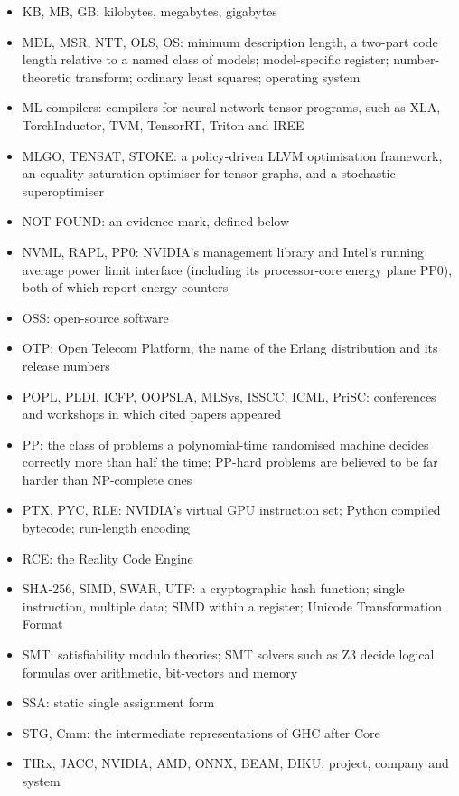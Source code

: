 \documentclass[10pt,letterpaper]{article}
\begin{document}
\begin{itemize}
  LTO, LZ77: link-time optimisation; Lempel--Ziv 1977 sliding-window
  compression
\item
  KB, MB, GB: kilobytes, megabytes, gigabytes
\item
  MDL, MSR, NTT, OLS, OS: minimum description length, a two-part code
  length relative to a named class of models; model-specific register;
  number-theoretic transform; ordinary least squares; operating system
\item
  ML compilers: compilers for neural-network tensor programs, such as
  XLA, TorchInductor, TVM, TensorRT, Triton and IREE
\item
  MLGO, TENSAT, STOKE: a policy-driven LLVM optimisation framework, an
  equality-saturation optimiser for tensor graphs, and a stochastic
  superoptimiser
\item
  NOT FOUND: an evidence mark, defined below
\item
  NVML, RAPL, PP0: NVIDIA's management library and Intel's running
  average power limit interface (including its processor-core energy
  plane PP0), both of which report energy counters
\item
  OSS: open-source software
\item
  OTP: Open Telecom Platform, the name of the Erlang distribution and
  its release numbers
\item
  POPL, PLDI, ICFP, OOPSLA, MLSys, ISSCC, ICML, PriSC: conferences and
  workshops in which cited papers appeared
\item
  PP: the class of problems a polynomial-time randomised machine decides
  correctly more than half the time; PP-hard problems are believed to be
  far harder than NP-complete ones
\item
  PTX, PYC, RLE: NVIDIA's virtual GPU instruction set; Python compiled
  bytecode; run-length encoding
\item
  RCE: the Reality Code Engine
\item
  SHA-256, SIMD, SWAR, UTF: a cryptographic hash function; single
  instruction, multiple data; SIMD within a register; Unicode
  Transformation Format
\item
  SMT: satisfiability modulo theories; SMT solvers such as Z3 decide
  logical formulas over arithmetic, bit-vectors and memory
\item
  SSA: static single assignment form
\item
  STG, Cmm: the intermediate representations of GHC after Core
\item
  TIRx, JACC, NVIDIA, AMD, ONNX, BEAM, DIKU: project, company and system

\end{itemize}
\end{document}

